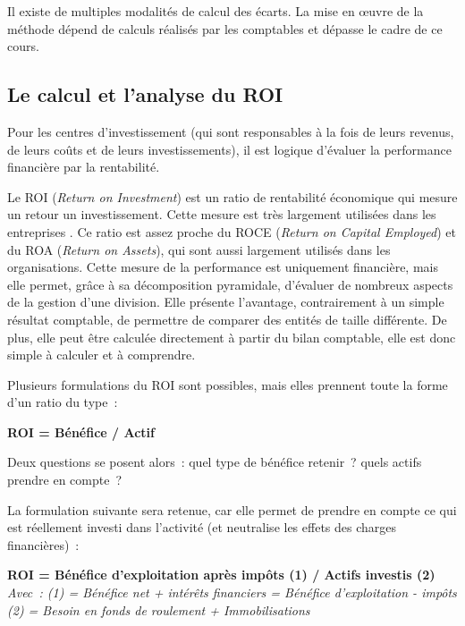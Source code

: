\documentclass[oneside]{kaobook}
\begin{document}
\begin{kaowarn}
Il existe de multiples modalités de calcul des écarts. La mise en œuvre de la méthode dépend de calculs réalisés par les comptables et dépasse le cadre de ce cours.
\end{kaowarn}

\subsection{Le calcul et l'analyse du ROI}
\label{sec:orgb6d9391}
Pour les centres d'investissement (qui sont responsables à la fois de leurs revenus, de leurs coûts et de leurs investissements), il est logique d'évaluer la performance financière par la rentabilité.

Le ROI (\emph{Return on Investment}) est un ratio de rentabilité économique qui mesure un retour un investissement. Cette mesure est très largement utilisées dans les entreprises . Ce ratio est assez proche du ROCE (\emph{Return on Capital Employed}) et du ROA (\emph{Return on Assets}), qui sont aussi largement utilisés dans les organisations. Cette mesure de la performance est uniquement financière, mais elle permet, grâce à sa décomposition pyramidale, d'évaluer de nombreux aspects de la gestion d'une division. Elle présente l'avantage, contrairement à un simple résultat comptable, de permettre de comparer des entités de taille différente. De plus, elle peut être calculée directement à partir du bilan comptable, elle est donc simple à calculer et à comprendre.

Plusieurs formulations du ROI sont possibles, mais elles prennent toute la forme d'un ratio du type : 
\begin{center}
\textbf{ROI = Bénéfice / Actif}
\end{center}

Deux questions se posent alors : quel type de bénéfice retenir ? quels actifs prendre en compte ? 

La formulation suivante sera retenue, car elle permet de prendre en compte ce qui est réellement investi dans l'activité (et neutralise les effets des charges financières) :
\begin{center}
\textbf{ROI = Bénéfice d'exploitation après impôts (1) / Actifs investis (2)}
\emph{Avec : (1) = Bénéfice net + intérêts financiers = Bénéfice d'exploitation - impôts (2) = Besoin en fonds de roulement + Immobilisations}
\end{center}
\end{document}
